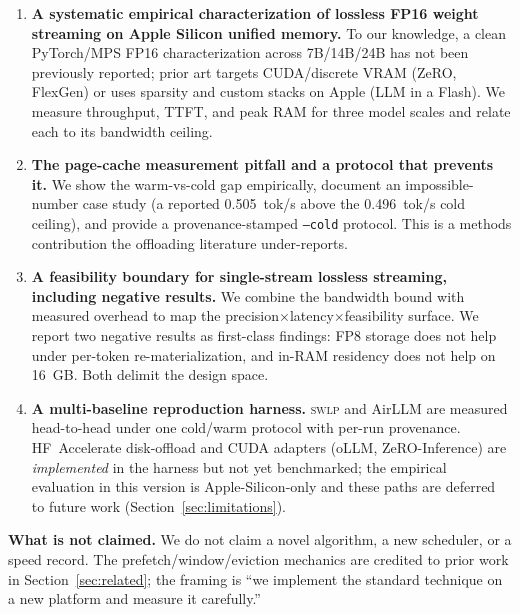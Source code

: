 \documentclass[10pt,a4paper]{article}
\newcommand{\swlp}{\textsc{swlp}}
\begin{document}
\begin{enumerate}[leftmargin=2em]
  \item \textbf{A systematic empirical characterization of lossless FP16 weight
    streaming on Apple Silicon unified memory.} To our knowledge, a clean
    PyTorch/MPS FP16 characterization across 7B/14B/24B has not been previously
    reported; prior art targets CUDA/discrete VRAM (ZeRO, FlexGen) or uses
    sparsity and custom stacks on Apple (LLM in a Flash). We measure throughput,
    TTFT, and peak RAM for three model scales and relate each to its
    bandwidth ceiling.

  \item \textbf{The page-cache measurement pitfall and a protocol that prevents
    it.} We show the warm-vs-cold gap empirically, document an impossible-number
    case study (a reported 0.505~tok/s above the 0.496~tok/s cold ceiling), and
    provide a provenance-stamped \texttt{--cold} protocol. This is a methods
    contribution the offloading literature under-reports.

  \item \textbf{A feasibility boundary for single-stream lossless streaming,
    including negative results.} We combine the bandwidth bound with measured
    overhead to map the precision$\times$latency$\times$feasibility surface. We
    report two negative results as first-class findings: FP8 storage does not
    help under per-token re-materialization, and in-RAM residency does not help
    on 16~GB. Both delimit the design space.

  \item \textbf{A multi-baseline reproduction harness.} \swlp{} and AirLLM are
    measured head-to-head under one cold/warm protocol with per-run provenance.
    HF~Accelerate disk-offload and CUDA adapters (oLLM, ZeRO-Inference) are
    \emph{implemented} in the harness but not yet benchmarked; the empirical
    evaluation in this version is Apple-Silicon-only and these paths are deferred
    to future work (Section~\ref{sec:limitations}).
\end{enumerate}

\textbf{What is not claimed.} We do not claim a novel algorithm, a new scheduler,
or a speed record. The prefetch/window/eviction mechanics are credited to prior
work in Section~\ref{sec:related}; the framing is ``we implement the standard
technique on a new platform and measure it carefully.''

\end{document}
